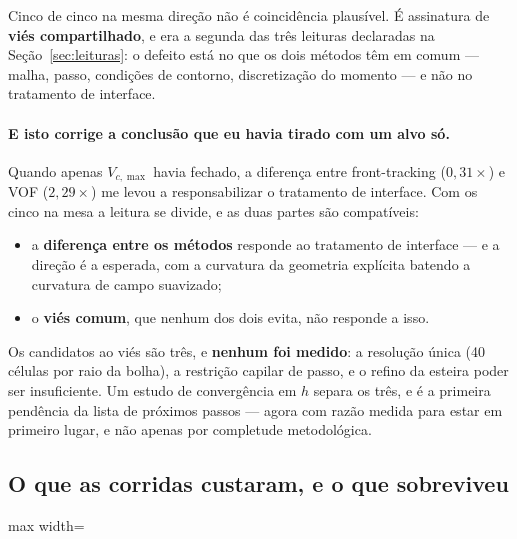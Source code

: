 Cinco de cinco na mesma dire\c{c}\~ao n\~ao \'e coincid\^encia plaus\'ivel. \'E
assinatura de \textbf{vi\'es compartilhado}, e era a segunda das tr\^es leituras
declaradas na Se\c{c}\~ao~\ref{sec:leituras}: o defeito est\'a no que os dois
m\'etodos t\^em em comum --- malha, passo, condi\c{c}\~oes de contorno,
discretiza\c{c}\~ao do momento --- e n\~ao no tratamento de interface.

\paragraph{E isto corrige a conclus\~ao que eu havia tirado com um alvo s\'o.}
Quando apenas $V_{c,\max}$ havia fechado, a diferen\c{c}a entre front-tracking
($0{,}31\times$) e VOF ($2{,}29\times$) me levou a responsabilizar o tratamento de
interface. Com os cinco na mesa a leitura se divide, e as duas partes s\~ao
compat\'iveis:

\begin{itemize}
  \item a \textbf{diferen\c{c}a entre os m\'etodos} responde ao tratamento de
    interface --- e a dire\c{c}\~ao \'e a esperada, com a curvatura da geometria
    expl\'icita batendo a curvatura de campo suavizado;
  \item o \textbf{vi\'es comum}, que nenhum dos dois evita, n\~ao responde a isso.
\end{itemize}

Os candidatos ao vi\'es s\~ao tr\^es, e \textbf{nenhum foi medido}: a
resolu\c{c}\~ao \'unica (40 c\'elulas por raio da bolha), a restri\c{c}\~ao
capilar de passo, e o refino da esteira poder ser insuficiente. Um estudo de
converg\^encia em $h$ separa os tr\^es, e \'e a primeira pend\^encia da lista de
pr\'oximos passos --- agora com raz\~ao medida para estar em primeiro lugar, e
n\~ao apenas por completude metodol\'ogica.

\subsection{O que as corridas custaram, e o que sobreviveu}

\begin{adjustbox}{max width=\linewidth}
\end{adjustbox}


